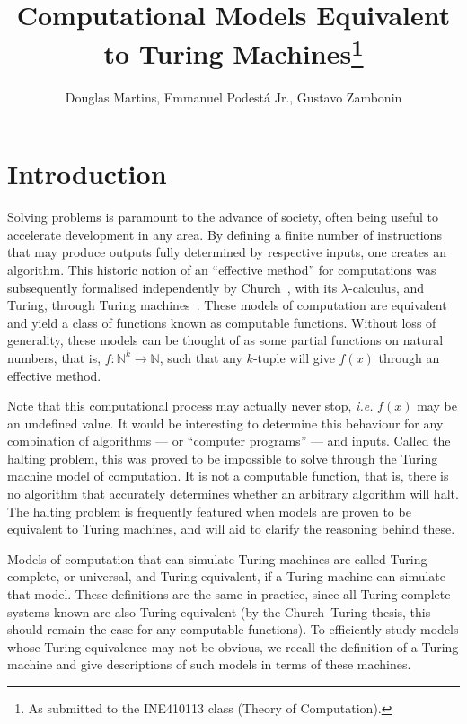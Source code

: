 \documentclass[12pt]{article}
\title{Computational Models Equivalent to Turing Machines\footnote{
    As submitted to the INE410113 class (Theory of Computation).}}
\author{Douglas Martins\inst{1}, Emmanuel Podestá Jr.\inst{1}, Gustavo
    Zambonin\inst{1}}
\begin{document}
\maketitle

\section{Introduction}\label{sec:intro}

Solving problems is paramount to the advance of society, often being useful to
accelerate development in any area. By defining a finite number of instructions
that may produce outputs fully determined by respective inputs, one creates an
algorithm. This historic notion of an ``effective method'' for computations was
subsequently formalised independently by Church~\cite{Church:article:1936:apr},
with its $\lambda$-calculus, and Turing, through Turing
machines~\cite{Turing:article:1937:jan}. These models of computation are
equivalent and yield a class of functions known as computable functions.
Without loss of generality, these models can be thought of as some partial
functions on natural numbers, that is, $f : \mathbb{N}^{k} \rightarrow
\mathbb{N}$, such that any $k$-tuple will give $f(x)$ through an effective
method.

Note that this computational process may actually never stop, \emph{i.e.}
$f(x)$ may be an undefined value. It would be interesting to determine this
behaviour for any combination of algorithms --- or ``computer programs'' ---
and inputs. Called the halting problem, this was proved to be impossible to
solve through the Turing machine model of computation. It is not a computable
function, that is, there is no algorithm that accurately determines whether an
arbitrary algorithm will halt. The halting problem is frequently featured when
models are proven to be equivalent to Turing machines, and will aid to clarify
the reasoning behind these.

Models of computation that can simulate Turing machines are called
Turing-complete, or universal, and Turing-equivalent, if a Turing machine can
simulate that model. These definitions are the same in practice, since all
Turing-complete systems known are also Turing-equivalent (by the Church--Turing
thesis, this should remain the case for any computable functions). To
efficiently study models whose Turing-equivalence may not be obvious, we recall
the definition of a Turing machine and give descriptions of such models in
terms of these machines.
\end{document}
